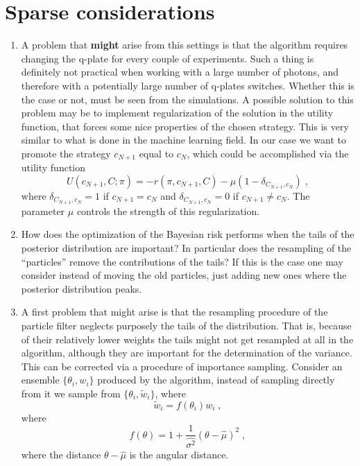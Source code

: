 \documentclass[aps, pra, 10pt, twocolumn, superscriptaddress,floatfix]{revtex4-1}
\begin{document}
\section{Sparse considerations}
%
\begin{enumerate}
	
\item A problem that \textbf{might} arise from this settings is that the algorithm requires changing the q-plate for every couple of experiments. Such a thing is definitely not practical when working with a large number of photons, and therefore with a potentially large number of q-plates switches. Whether this is the case or not, must be seen from the simulations. A possible solution to this problem may be to implement regularization of the solution in the utility function, that forces some nice properties of the chosen strategy. This is very similar to what is done in the machine learning field. In our case we want to promote the strategy $c_{N+1}$ equal to $c_{N}$, which could be accomplished via the utility function
%
\begin{equation}
U(c_{N+1}, C; \pi) = -r (\pi, c_{N+1}, C) - \mu \left( 1 - \delta_{C_{N+1}, c_N}\right) \; ,
\end{equation}
% 
where $\delta_{C_{N+1}, c_N} = 1$ if $c_{N+1} = c_N$ and $\delta_{C_{N+1}, c_N} = 0$ if $c_{N+1} \neq c_N$. The parameter $\mu$ controls the strength of this regularization. 

\item How does the optimization of the Bayesian risk performs when the tails of the posterior distribution are important? In particular does the resampling of the ``particles'' remove the contributions of the tails? If this is the case one may consider instead of moving the old particles, just adding new ones where the posterior distribution peaks.
	
\item A first problem that might arise is that the resampling procedure of the particle filter neglects purposely the tails of the distribution. That is, because of their relatively lower weights the tails might not get resampled at all in the algorithm, although they are important for the determination of the variance. This can be corrected via a procedure of importance sampling. Consider an ensemble $\lbrace \theta_i, w_i \rbrace$ produced by the algorithm, instead of sampling directly from it we sample from $\lbrace \theta_i, \tilde{w}_i \rbrace$, where 
%
\begin{equation}
	\tilde{w}_i = f(\theta_i) w_i \; , 
\end{equation}
%
where 
%
\begin{equation}
	f(\theta) = 1 + \frac{1}{\hat{\sigma^2}} (\theta - \hat{\mu})^2 \; ,
\end{equation}
%
where the distance $\theta - \hat{\mu}$ is the angular distance.


\end{enumerate}
\end{document}
